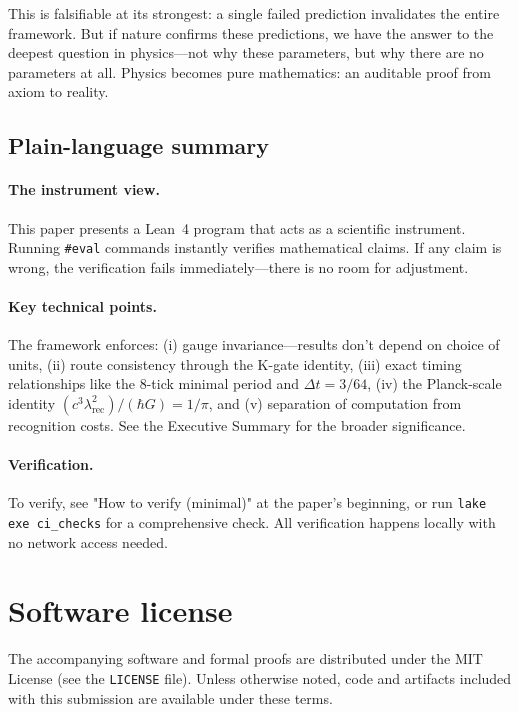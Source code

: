 \documentclass[11pt,a4paper,twoside]{article}
\numberwithin{equation}{section}
\theoremstyle{customthm}
\theoremstyle{customdef}
\theoremstyle{customrem}
\begin{document}
This is falsifiable at its strongest: a single failed prediction invalidates the entire framework. But if nature confirms these predictions, we have the answer to the deepest question in physics—not why these parameters, but why there are no parameters at all. Physics becomes pure mathematics: an auditable proof from axiom to reality.

\subsection{Plain-language summary}\label{subsec:informal}

\paragraph{The instrument view.} This paper presents a Lean~4 program that acts as a scientific instrument. Running \texttt{\#eval} commands instantly verifies mathematical claims. If any claim is wrong, the verification fails immediately—there is no room for adjustment.

\paragraph{Key technical points.} The framework enforces: (i) gauge invariance—results don't depend on choice of units, (ii) route consistency through the K-gate identity, (iii) exact timing relationships like the 8-tick minimal period and $\Delta t = 3/64$, (iv) the Planck-scale identity $(c^3\lambda_{\mathrm{rec}}^2)/(\hbar G) = 1/\pi$, and (v) separation of computation from recognition costs. See the Executive Summary for the broader significance.

\paragraph{Verification.} To verify, see "How to verify (minimal)" at the paper's beginning, or run \texttt{lake exe ci\_checks} for a comprehensive check. All verification happens locally with no network access needed.
\section*{Software license}\label{sec:license}
The accompanying software and formal proofs are distributed under the MIT License (see the \texttt{LICENSE} file). Unless otherwise noted, code and artifacts included with this submission are available under these terms.
\end{document}
